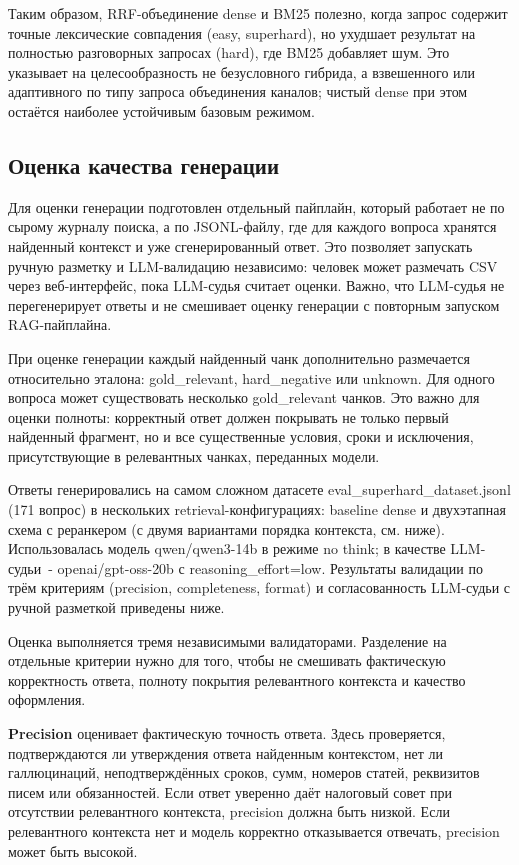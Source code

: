 \documentclass[a4paper,12pt]{article}
\begin{document}
Таким образом, RRF-объединение dense и BM25 полезно, когда запрос содержит точные лексические совпадения (easy, superhard), но ухудшает результат на полностью разговорных запросах (hard), где BM25 добавляет шум. Это указывает на целесообразность не безусловного гибрида, а взвешенного или адаптивного по типу запроса объединения каналов; чистый dense при этом остаётся наиболее устойчивым базовым режимом.

\subsection{Оценка качества генерации}

Для оценки генерации подготовлен отдельный пайплайн, который работает не по сырому журналу поиска, а по JSONL-файлу, где для каждого вопроса хранятся найденный контекст и уже сгенерированный ответ. Это позволяет запускать ручную разметку и LLM-валидацию независимо: человек может размечать CSV через веб-интерфейс, пока LLM-судья считает оценки. Важно, что LLM-судья не перегенерирует ответы и не смешивает оценку генерации с повторным запуском RAG-пайплайна.

При оценке генерации каждый найденный чанк дополнительно размечается относительно эталона: gold\_relevant, hard\_negative или unknown. Для одного вопроса может существовать несколько gold\_relevant чанков. Это важно для оценки полноты: корректный ответ должен покрывать не только первый найденный фрагмент, но и все существенные условия, сроки и исключения, присутствующие в релевантных чанках, переданных модели.

Ответы генерировались на самом сложном датасете eval\_superhard\_dataset.jsonl (171 вопрос) в нескольких retrieval-конфигурациях: baseline dense и двухэтапная схема с реранкером (с двумя вариантами порядка контекста, см. ниже). Использовалась модель qwen/qwen3-14b в режиме no think; в качестве LLM-судьи~- openai/gpt-oss-20b с reasoning\_effort=low. Результаты валидации по трём критериям (precision, completeness, format) и согласованность LLM-судьи с ручной разметкой приведены ниже.

Оценка выполняется тремя независимыми валидаторами. Разделение на отдельные критерии нужно для того, чтобы не смешивать фактическую корректность ответа, полноту покрытия релевантного контекста и качество оформления.

\textbf{Precision} оценивает фактическую точность ответа. Здесь проверяется, подтверждаются ли утверждения ответа найденным контекстом, нет ли галлюцинаций, неподтверждённых сроков, сумм, номеров статей, реквизитов писем или обязанностей. Если ответ уверенно даёт налоговый совет при отсутствии релевантного контекста, precision должна быть низкой. Если релевантного контекста нет и модель корректно отказывается отвечать, precision может быть высокой.
\end{document}
